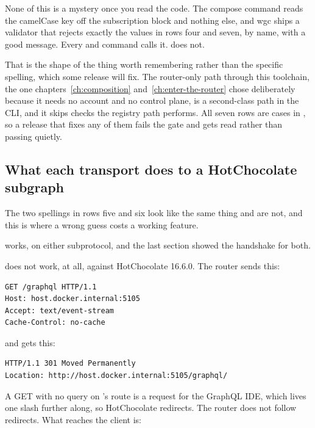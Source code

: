 None of this is a mystery once you read the code. The compose command reads the
camelCase key off the subscription block and nothing else, and wgc ships a
validator that rejects exactly the values in rows four and seven, by name, with
a good message. Every  and  command calls it.
 does not.

That is the shape of the thing worth remembering rather than the specific
spelling, which some release will fix. The router-only path through this
toolchain, the one chapters~\ref{ch:composition} and~\ref{ch:enter-the-router}
chose deliberately because it needs no account and no control plane, is a
second-class path in the CLI, and it skips checks the registry path performs.
All seven rows are cases in , so a release that
fixes any of them fails the gate and gets read rather than passing quietly.

\subsection*{What each transport does to a HotChocolate subgraph}

%
The two spellings in rows five and six look like the same thing and are not,
and this is where a wrong guess costs a working feature.

 works, on either subprotocol, and the last section showed the
handshake for both.

 does not work, at all, against HotChocolate 16.6.0. The router sends
this:

\begin{verbatim}
GET /graphql HTTP/1.1
Host: host.docker.internal:5105
Accept: text/event-stream
Cache-Control: no-cache
\end{verbatim}

and gets this:

\begin{verbatim}
HTTP/1.1 301 Moved Permanently
Location: http://host.docker.internal:5105/graphql/
\end{verbatim}

%
A GET with no query on 's route is a request for the GraphQL
IDE, which lives one slash further along, so HotChocolate redirects. The router
does not follow redirects. What reaches the client is:

